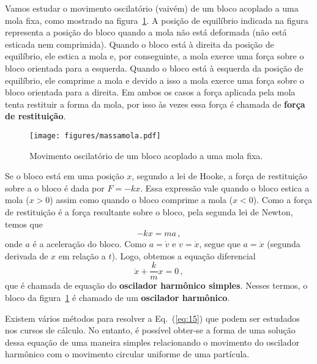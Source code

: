 \documentclass[12pt,a4paper]{article}
\theoremstyle{definition}
\begin{document}
Vamos estudar o movimento oscilatório (vaivém) de um bloco acoplado a
uma mola fixa, como mostrado na figura~\ref{fig:massamola}. A posição
de equilíbrio indicada na figura representa a posição do bloco quando
a mola não está deformada (não está esticada nem comprimida). Quando o
bloco está à direita da posição de equilíbrio, ele estica a mola e,
por conseguinte, a mola exerce uma força sobre o bloco orientada para
a esquerda. Quando o bloco está à esquerda da posição de equilíbrio,
ele comprime a mola e devido a isso a mola exerce uma força sobre o
bloco orientada para a direita. Em ambos os casos a força aplicada
pela mola tenta restituir a forma da mola, por isso às vezes essa
força é chamada de \textbf{força de restituição}.
\begin{figure}[t]
  \centering
  \texttt{[image: figures/massamola.pdf]}
  \caption{Movimento oscilatório de um bloco acoplado a uma mola
    fixa.}
  \label{fig:massamola}
\end{figure}

Se o bloco está em uma posição $x$, segundo a lei de Hooke, a força de
restituição sobre a o bloco é dada por $F=-kx$. Essa expressão vale
quando o bloco estica a mola ($x>0$) assim como quando o bloco
comprime a mola ($x<0$). Como a força de restituição é a força
resultante sobre o bloco, pela segunda lei de Newton, temos que
$$-kx=ma\,,$$
onde $a$ é a aceleração do bloco. Como $a=\dot v$ e $v=\dot x$, segue
que $a=\ddot x$ (segunda derivada de $x$ em relação a $t$). Logo,
obtemos a equação diferencial
\begin{equation}
  \label{eq:15}
  \ddot x+\frac{k}{m}x=0\,,
\end{equation}
que é chamada de equação do \textbf{oscilador harmônico
  simples}. Nesses termos, o bloco da figura~\ref{fig:massamola} é
chamado de um \textbf{oscilador harmônico}.

Existem vários métodos para resolver a Eq.~(\ref{eq:15}) que podem ser
estudados nos cursos de cálculo. No entanto, é possível obter-se a
forma de uma solução dessa equação de uma maneira simples relacionando
o movimento do oscilador harmônico com o movimento circular uniforme
de uma partícula.
\end{document}
